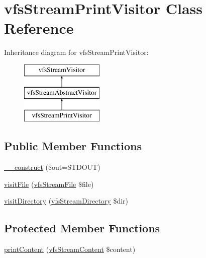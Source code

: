 \hypertarget{classorg_1_1bovigo_1_1vfs_1_1visitor_1_1vfs_stream_print_visitor}{}\section{vfs\+Stream\+Print\+Visitor Class Reference}
\label{classorg_1_1bovigo_1_1vfs_1_1visitor_1_1vfs_stream_print_visitor}
Inheritance diagram for vfs\+Stream\+Print\+Visitor\+:\begin{figure}[H]
\begin{center}
\leavevmode
\includegraphics[height=3.000000cm]{classorg_1_1bovigo_1_1vfs_1_1visitor_1_1vfs_stream_print_visitor}
\end{center}
\end{figure}
\subsection*{Public Member Functions}
\begin{DoxyCompactItemize}
\item 
\mbox{\hyperlink{classorg_1_1bovigo_1_1vfs_1_1visitor_1_1vfs_stream_print_visitor_a06fa66ede64ad757c3c997c171c754db}{\+\_\+\+\_\+construct}} (\$out=S\+T\+D\+O\+UT)
\item 
\mbox{\hyperlink{classorg_1_1bovigo_1_1vfs_1_1visitor_1_1vfs_stream_print_visitor_aefbf1a8429cc874e03034c19eeba5a07}{visit\+File}} (\mbox{\hyperlink{classorg_1_1bovigo_1_1vfs_1_1vfs_stream_file}{vfs\+Stream\+File}} \$file)
\item 
\mbox{\hyperlink{classorg_1_1bovigo_1_1vfs_1_1visitor_1_1vfs_stream_print_visitor_a58aba2b3abdff052e38254bba19aac72}{visit\+Directory}} (\mbox{\hyperlink{classorg_1_1bovigo_1_1vfs_1_1vfs_stream_directory}{vfs\+Stream\+Directory}} \$dir)
\end{DoxyCompactItemize}
\subsection*{Protected Member Functions}
\begin{DoxyCompactItemize}
\item 
\mbox{\hyperlink{classorg_1_1bovigo_1_1vfs_1_1visitor_1_1vfs_stream_print_visitor_a572c2173fd7442929a4f7529493e33f8}{print\+Content}} (\mbox{\hyperlink{interfaceorg_1_1bovigo_1_1vfs_1_1vfs_stream_content}{vfs\+Stream\+Content}} \$content)
\end{DoxyCompactItemize}

